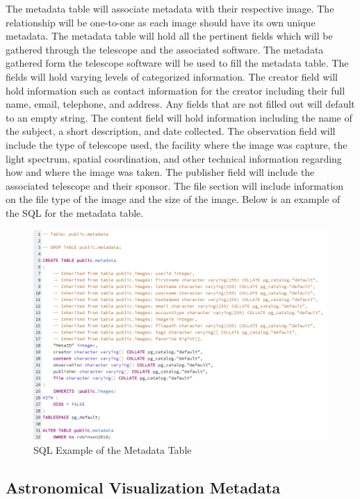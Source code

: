 \documentclass[12pt]{report}
\begin{document}
\begin{enumerate}
The metadata table will associate metadata with their respective image.  The relationship will be one-to-one as each image should have its own unique metadata.  The metadata table will hold all the pertinent fields which will be gathered through the telescope and the associated software.  The metadata gathered form the telescope software will be used to fill the metadata table.  The fields will hold varying levels of categorized information.  The creator field will hold information such as contact information for the creator including their full name, email, telephone, and address.  Any fields that are not filled out will default to an empty string.  The content field will hold information including the name of the subject, a short description, and date collected.  The observation field will include the type of telescope used, the facility where the image was capture, the light spectrum, spatial coordination, and other technical information regarding how and where the image was taken.  The publisher field will include the associated telescope and their sponsor.  The file section will include information on the file type of the image and the size of the image.  Below is an example of the SQL for the metadata table.

\begin{figure}[h]
	\centering
	\includegraphics[width=\linewidth]{database_metadata_table}
	\caption{SQL Example of the Metadata Table}
	\label{fig:SQL Metadata Table}
\end{figure}

\subsection{Astronomical Visualization Metadata}


\end{enumerate}
\end{document}
